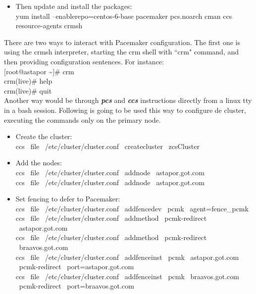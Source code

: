 \documentclass[a4paper, 12pt]{book}
\begin{document}
\begin{itemize}
	\item Then update and install the packages:\\
		yum install --enablerepo=centos-6-base pacemaker pcs.noarch  cman ccs resource-agents crmsh
\end{itemize}

\noindent There are two ways to interact with Pacemaker configuration. The first one is using the crmsh interpreter, starting the crm shell with ``crm" command, and then providing configuration sentences. For instance:\\

	[root@astapor \textasciitilde]\# crm\\
	crm(live)\# help\\
	crm(live)\# quit\\

\noindent Another way would be through \textit{\textbf{pcs}} and \textit{\textbf{ccs}} instructions directly from a linux tty in a bash session. Following is going to be used this way to configure de cluster, executing the commands only on the primary node.


\begin{itemize}
	\item Create the cluster:\\
		ccs \ \textminus \textminus file \ /etc/cluster/cluster.conf \ \textminus \textminus createcluster \ zcsCluster
\end{itemize}


\begin{itemize}
	\item Add the nodes:\\
		ccs \ \textminus \textminus file \ /etc/cluster/cluster.conf \ \textminus \textminus addnode \ astapor.got.com\\
		ccs \ \textminus \textminus file \ /etc/cluster/cluster.conf \ \textminus \textminus addnode \ astapor.got.com\\
\end{itemize}


\begin{itemize}
	\item Set fencing to defer to Pacemaker:\\
		ccs \ \textminus \textminus file \ /etc/cluster/cluster.conf \ \textminus \textminus addfencedev \ pcmk \ agent=fence\_pcmk\\
		ccs \ \textminus \textminus file \ /etc/cluster/cluster.conf \ \textminus \textminus addmethod \ pcmk-redirect \ astapor.got.com\\
		ccs \ \textminus \textminus file \ /etc/cluster/cluster.conf \ \textminus \textminus addmethod \ pcmk-redirect \ braavos.got.com\\
		ccs \ \textminus \textminus file \ /etc/cluster/cluster.conf \ \textminus \textminus addfenceinst \ pcmk \ astapor.got.com \ pcmk-redirect \ port=astapor.got.com\\
		ccs \ \textminus \textminus file \ /etc/cluster/cluster.conf \ \textminus \textminus addfenceinst \ pcmk \ braavos.got.com \ pcmk-redirect \ port=braavos.got.com\\
\end{itemize}
\end{document}
